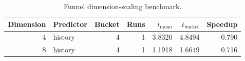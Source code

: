 \begin{table}[t]
\centering
\caption{Funnel dimension-scaling benchmark.}
\label{tab:dimension-scaling}
\begin{tabular}{rlrrrrr}
\hline
Dimension & Predictor & Bucket & Runs & $t_{\mathrm{mono}}$ & $t_{\mathrm{bucket}}$ & Speedup \\
\hline
4 & history & 4 & 1 & 3.8320 & 4.8494 & 0.790 \\
8 & history & 4 & 1 & 1.1918 & 1.6649 & 0.716 \\
\hline
\end{tabular}
\end{table}
